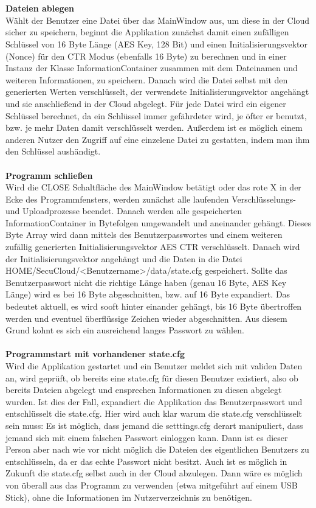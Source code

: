 \documentclass[12pt,a4paper,bibliography=totocnumbered,listof=totocnumbered]{scrartcl}
\begin{document}
\\\\\textbf{Dateien ablegen}\\
Wählt der Benutzer eine Datei über das MainWindow aus, um diese in der Cloud sicher zu speichern, beginnt die Applikation zunächst damit einen zufälligen Schlüssel von 16 Byte Länge (AES Key, 128 Bit) und einen Initialisierungsvektor (Nonce) für den CTR Modus (ebenfalls 16 Byte) zu berechnen und in einer Instanz der Klasse InformationContainer zusammen mit dem Dateinamen und weiteren Informationen, zu speichern. Danach wird die Datei selbst mit den generierten Werten verschlüsselt, der verwendete Initialisierungsvektor angehängt und sie anschließend in der Cloud abgelegt. Für jede Datei wird ein eigener Schlüssel berechnet, da ein Schlüssel immer gefährdeter wird, je öfter er benutzt, bzw. je mehr Daten damit verschlüsselt werden. Außerdem ist es möglich einem anderen Nutzer den Zugriff auf eine einzelene Datei zu gestatten, indem man ihm den Schlüssel aushändigt. 
\\\\\textbf{Programm schließen}\\
Wird die CLOSE Schaltfläche des MainWindow betätigt oder das rote X in der Ecke des Programmfensters, werden zunächst alle laufenden Verschlüsselungs- und Uploadprozesse beendet. Danach werden alle gespeicherten InformationContainer in Bytefolgen umgewandelt und aneinander gehängt. Dieses Byte Array wird dann mittels des Benutzerpasswortes und einem weiteren zufällig generierten Initialisierungsvektor AES CTR verschlüsselt. Danach wird der Initialisierungsvektor angehängt und die Daten in die Datei HOME/SecuCloud/\textless Benutzername\textgreater/data/state.cfg gespeichert. Sollte das Benutzerpasswort nicht die richtige Länge haben (genau 16 Byte, AES Key Länge) wird es bei 16 Byte abgeschnitten, bzw. auf 16 Byte expandiert. Das bedeutet aktuell, es wird sooft hinter einander gehängt, bis 16 Byte übertroffen werden und eventuel überflüssige Zeichen wieder abgeschnitten. Aus diesem Grund kohnt es sich ein ausreichend langes Passwort zu wählen.
\\\\\textbf{Programmstart mit vorhandener state.cfg}\\
Wird die Applikation gestartet und ein Benutzer meldet sich mit validen Daten an, wird geprüft, ob bereits eine state.cfg für diesen Benutzer existiert, also ob bereits Dateien abgelegt und ensprechen Informationen zu diesen abgelegt wurden. Ist dies der Fall, expandiert die Applikation das Benutzerpasswort und entschlüsselt die state.cfg. Hier wird auch klar warum die state.cfg verschlüsselt sein muss: Es ist möglich, dass jemand die setttings.cfg derart manipuliert, dass jemand sich mit einem falschen Passwort einloggen kann. Dann ist es dieser Person aber nach wie vor nicht möglich die Dateien des eigentlichen Benutzers zu entschlüsseln, da er das echte Passwort nicht besitzt. Auch ist es möglich in Zukunft die state.cfg selbst auch in der Cloud abzulegen. Dann wäre es möglich von überall aus das Programm zu verwenden (etwa mitgeführt auf einem USB Stick), ohne die Informationen im Nutzerverzeichnis zu benötigen.
\end{document}
